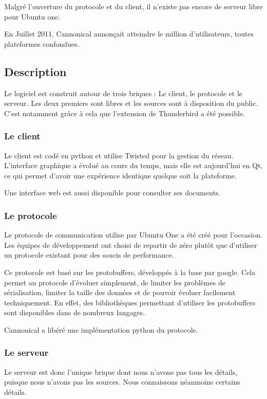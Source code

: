 Malgré l'ouverture du protocole et du client, il n'existe pas encore de serveur libre pour Ubuntu one.

En Juillet 2011, Cannonical annonçait atteindre le million d'utilisateurs, toutes plateformes confondues.

\subsection{Description}
Le logiciel est construit autour de trois briques : Le client, le protocole et le serveur. Les deux premiers sont libres et les sources sont à disposition du public. C'est notamment grâce à cela que l'extension de Thunderbird a été possible.

\subsubsection{Le client}
Le client est codé en python et utilise Twisted pour la gestion du réseau. L'interface graphique a évolué au cours du temps, mais elle est aujourd'hui en Qt, ce qui permet d'avoir une expérience identique quelque soit la plateforme.

Une interface web est aussi disponible pour consulter ses documents.

\subsubsection{Le protocole}

Le protocole de communication utilise par Ubuntu One a été créé pour l'occasion. Les équipes de développement ont choisi de repartir de zéro plutôt que d'utiliser un protocole existant pour des soucis de performance.

Ce protocole est basé sur les protobuffers, développés à la base par google. Cela permet au protocole d'évoluer simplement, de limiter les problèmes de sérialisation, limiter la taille des données et de pouvoir évoluer facilement techniquement. En effet, des bibliothèques permettant d'utiliser les protobuffers sont disponibles dans de nombreux langages.

Cannonical a libéré une implémentation python du protocole.

\subsubsection{Le serveur}

Le serveur est donc l'unique brique dont nous n'avons pas tous les détails, puisque nous n'avons pas les sources. Nous connaissons néanmoins certains détails.

